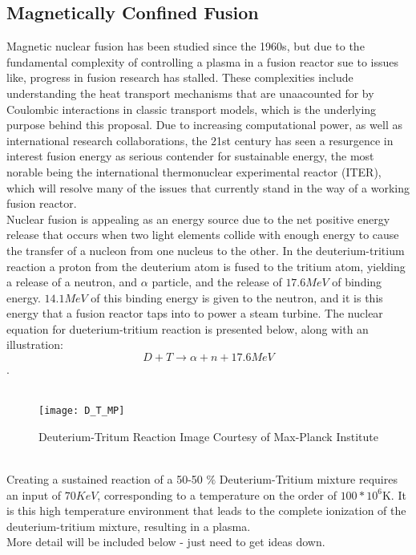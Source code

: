 \documentclass{article}
\begin{document}
\subsection{Magnetically Confined Fusion}
Magnetic nuclear fusion has been studied since the 1960s, but due to the fundamental complexity of controlling a plasma in a fusion reactor sue to issues like, progress in fusion research has stalled. These complexities include understanding the heat transport mechanisms that are unaacounted for by Coulombic interactions in classic transport models, which is the underlying purpose behind this proposal. Due to increasing computational power, as well as international  research collaborations, the 21st century has seen a resurgence in interest fusion energy as serious contender for sustainable energy, the most norable being the international thermonuclear experimental reactor (ITER), which will resolve many of the issues that currently stand in the way of a working fusion reactor.\\
Nuclear fusion is appealing as an energy source due to the net positive energy release that occurs when two light elements collide with enough energy to cause the transfer of a nucleon from one nucleus to the other. In the deuterium-tritium reaction a proton from the deuterium atom is fused to the tritium atom, yielding a release of a neutron, and $\alpha$ particle, and the release of $17.6 MeV$ of binding energy. $14.1 MeV$ of this binding energy is given to the neutron, and it is this energy that a fusion reactor taps into to power a steam turbine. The nuclear equation for dueterium-tritium reaction is presented below, along with an illustration:
$$
D+T \rightarrow \alpha + n + 17.6 MeV
$$
 \cite{J_Friedberg:1} .\\
\\
\begin{figure}[h]
	\centering
	\texttt{[image: D\_T\_MP]}
	\caption{Deuterium-Tritum Reaction Image Courtesy of Max-Planck Institute}
\end{figure}
\\
Creating a sustained reaction of a 50-50 $\%$ Deuterium-Tritium mixture requires an input of $70KeV$, corresponding to a temperature on the order of $100*10^6$K. It is this high temperature environment that leads to the complete ionization of the deuterium-tritium mixture, resulting in a plasma.\\
More detail will be included below - just need to get ideas down.\\
\end{document}
